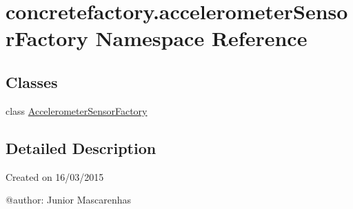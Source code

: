 \hypertarget{namespaceconcretefactory_1_1accelerometerSensorFactory}{}\section{concretefactory.\+accelerometer\+Sensor\+Factory Namespace Reference}
\label{namespaceconcretefactory_1_1accelerometerSensorFactory}
\subsection*{Classes}
\begin{DoxyCompactItemize}
\item 
class \hyperlink{classconcretefactory_1_1accelerometerSensorFactory_1_1AccelerometerSensorFactory}{Accelerometer\+Sensor\+Factory}
\end{DoxyCompactItemize}


\subsection{Detailed Description}
\begin{DoxyVerb}Created on 16/03/2015

@author: Junior Mascarenhas
\end{DoxyVerb}
 